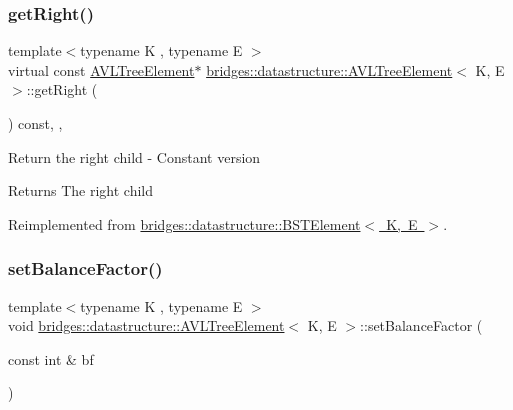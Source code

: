 \subsubsection{\texorpdfstring{getRight()}{getRight()}\hspace{0.1cm}{\footnotesize\ttfamily [2/2]}}
{\footnotesize\ttfamily template$<$typename K , typename E $>$ \\
virtual const \mbox{\hyperlink{classbridges_1_1datastructure_1_1_a_v_l_tree_element}{A\+V\+L\+Tree\+Element}}$\ast$ \mbox{\hyperlink{classbridges_1_1datastructure_1_1_a_v_l_tree_element}{bridges\+::datastructure\+::\+A\+V\+L\+Tree\+Element}}$<$ K, E $>$\+::get\+Right (\begin{DoxyParamCaption}{ }\end{DoxyParamCaption}) const\hspace{0.3cm}{\ttfamily [inline]}, {\ttfamily [override]}, {\ttfamily [virtual]}}

Return the right child -\/ Constant version

\begin{DoxyReturn}{Returns}
The right child 
\end{DoxyReturn}


Reimplemented from \mbox{\hyperlink{classbridges_1_1datastructure_1_1_b_s_t_element_a012f0eb09c3d62b14c73109e6ded0879}{bridges\+::datastructure\+::\+B\+S\+T\+Element$<$ K, E $>$}}.

\mbox{\label{classbridges_1_1datastructure_1_1_a_v_l_tree_element_a32af51a86585479c28de425374df95e9}} 
\subsubsection{\texorpdfstring{setBalanceFactor()}{setBalanceFactor()}}
{\footnotesize\ttfamily template$<$typename K , typename E $>$ \\
void \mbox{\hyperlink{classbridges_1_1datastructure_1_1_a_v_l_tree_element}{bridges\+::datastructure\+::\+A\+V\+L\+Tree\+Element}}$<$ K, E $>$\+::set\+Balance\+Factor (\begin{DoxyParamCaption}\item[{const int \&}]{bf }\end{DoxyParamCaption})\hspace{0.3cm}{\ttfamily [inline]}}

